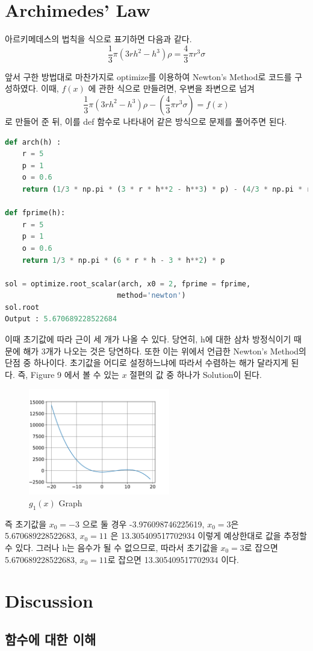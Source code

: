 \documentclass[11pt]{article}
\begin{document}
\section{Archimedes’ Law}
아르키메데스의 법칙을 식으로 표기하면 다음과 같다.
$$
\frac{1}{3}\pi (3rh^2 - h^3) \rho = \frac{4}{3}\pi r^3\sigma
$$

\noindent  
앞서 구한 방법대로 마찬가지로  optimize를 이용하여 Newton's Method로 코드를 구성하였다. 이때, $f(x)$ 에 관한 식으로 만들려면,  우변을 좌변으로 넘겨
$$
\frac{1}{3}\pi (3rh^2 - h^3) \rho - ( \frac{4}{3}\pi r^3\sigma ) = f(x) 
$$
로 만들어 준 뒤, 이를 def 함수로 나타내어 같은 방식으로 문제를 풀어주면 된다. 
\begin{lstlisting}[language=Python]
def arch(h) :
    r = 5
    p = 1
    o = 0.6
    return (1/3 * np.pi * (3 * r * h**2 - h**3) * p) - (4/3 * np.pi * r**3 * o)

def fprime(h):
    r = 5
    p = 1
    o = 0.6
    return 1/3 * np.pi * (6 * r * h - 3 * h**2) * p

sol = optimize.root_scalar(arch, x0 = 2, fprime = fprime, 
                          method='newton')
sol.root
Output : 5.670689228522684
\end{lstlisting}

이때 초기값에 따라 근이 세 개가 나올 수 있다. 당연히, h에 대한 삼차 방정식이기 때문에 해가 3개가 나오는 것은 당연하다. 또한 이는 위에서 언급한 Newton's Method의 단점 중 하나이다. 초기값을 어디로 설정하느냐에 따라서 수렴하는 해가 달라지게 된다. 즉, Figure 9 에서 볼 수 있는 $x$ 절편의 값 중 하나가 Solution이 된다.

\begin{figure}[!ht]
  \centering
  \includegraphics[width=0.55\textwidth]{Newton_Method3.pdf}
  \caption{$g_1(x)$ Graph}
\end{figure}

즉 초기값을 $x_0 = -3$ 으로 둘 경우 -3.976098746225619, $x_0 = 3$은 5.670689228522683, $x_0 = 11$ 은 13.305409517702934 이렇게 예상한대로 값을 추정할 수 있다. 그러나 h는 음수가 될 수 없으므로, 따라서 초기값을 $x_0 = 3$로 잡으면 5.670689228522683, $x_0 = 11$로 잡으면 13.305409517702934 이다.
\clearpage



\section{Discussion}
\subsection{함수에 대한 이해} 
\end{document}
